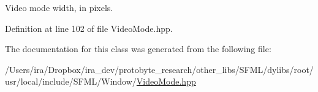 Video mode width, in pixels. 



Definition at line 102 of file Video\-Mode.\-hpp.



The documentation for this class was generated from the following file\-:\begin{DoxyCompactItemize}
\item 
/\-Users/ira/\-Dropbox/ira\-\_\-dev/protobyte\-\_\-research/other\-\_\-libs/\-S\-F\-M\-L/dylibs/root/usr/local/include/\-S\-F\-M\-L/\-Window/\hyperlink{_video_mode_8hpp}{Video\-Mode.\-hpp}\end{DoxyCompactItemize}
